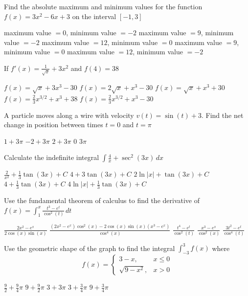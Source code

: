 \documentclass[11pt]{article}
\begin{document}
\begin{questions}
\begin{multiplechoice}{5}

\question Find the absolute maximum and minimum values for the function 
$f(x) = 3x^2 - 6x + 3$ on the interval $[-1, 3]$
\begin{answers}{1}
\ans maximum value $= 0$, minimum value $ = -2$
\ans maximum value $= 9$, minimum value $ = -2$
\ans maximum value $= 12$, minimum value $ = 0$
\ans maximum value $= 9$, minimum value $ = 0$
\ans maximum value $= 12$, minimum value $ = -2$
\end{answers}


\question If $f'(x) = \frac{1}{\sqrt{x}} + 3x^2$ and $f(4) = 38$
\begin{answers}{2}
\ans $f(x) = \sqrt{x} + 3x^3 -30$
\ans $f(x) = 2\sqrt{x} + x^3 - 30$
\ans $f(x) = \sqrt{x} + x^3 + 30$
\ans $f(x) = \frac{2}{3} x^{3/2} + x^3 + 38$
\ans $f(x) = \frac{2}{3} x^{3/2} + x^3 - 30$ 
\end{answers}


\question A particle moves along a wire with velocity $v(t) = \sin(t) + 3$.  Find the
net change in position between times $t = 0$ and $t = \pi$
\begin{answers}{2}
\ans $1  + 3\pi$
\ans $-2 + 3\pi$
\ans $2 + 3\pi$
\ans $0$
\ans $3\pi$
\end{answers}

\question Calculate the indefinite integral 
$\displaystyle \int \frac{4}{x} + \sec^2(3x) \, dx$
\begin{answers}{2}
\ans $\frac{2}{x^2} + \frac{1}{3}\tan(3x) + C$
\ans $4 + 3 \tan(3x) + C$
\ans $2 \ln|x|  + \tan(3x) + C$
\ans $4  + \frac{1}{3}\tan(3x) + C$
\ans $4 \ln |x| + \frac{1}{3}\tan(3x) + C$
\end{answers}


\newpage

\question Use the fundamental theorem of calculus to find the derivative of 
$\displaystyle f(x) = \int_1^x \frac{t^3 - e^t}{\cos^2(t)} \, dt$
\begin{answers}{2}
\ans $\frac{2x^2 - e^x}{2 \cos(x) \sin(x)}$
\ans $\frac{(2x^2 - e^x)\cos^2(x) - 2 \cos(x) \sin(x) (x^3 - e^x)}{\cos^4(x)}$
\ans $\frac{t^4 - e^t}{\cos^2(t)}$
\ans $\frac{x^3 - e^x}{\cos^2(x)}$
\ans $\frac{3 t^2 - e^t}{\cos^4(t)}$
\end{answers}

\question Use the geometric shape of the graph to find the integral 
$\displaystyle \int_{-3}^3 f(x)$ where 
$$ f(x) = 
\begin{cases}
3 - x, & x \le 0 \\
\sqrt{9 - x^2}, & x > 0
\end{cases}
$$
\begin{answers}{2}
\ans $\frac{9}{2} + \frac{9}{4}\pi$
\ans $9 + \frac{9}{2}\pi$
\ans $3 + 3\pi$
\ans $3 + \frac{3}{4}\pi$
\ans $9 + \frac{3}{4}\pi$
\end{answers}


\end{multiplechoice}
\end{questions}
\end{document}
